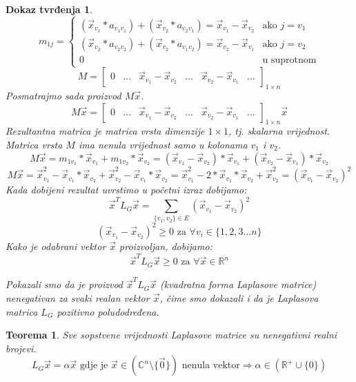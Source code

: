 \documentclass[11pt]{article}
\newtheorem{theorem}{Teorema}
\newtheorem*{custom_proof}{Dokaz tvrđenja}
\begin{document}
\begin{custom_proof}
	\[
	 m_{1j} =
	 \begin{cases}
	 (\vec{x}_{v_1} * a_{v_1 v_1}) + (\vec{x}_{v_2} * a_{v_2 v_1}) = \vec{x}_{v_1} - \vec{x}_{v_2}   & \text{ako } j = v_1 \\ 
	 (\vec{x}_{v_2} * a_{v_2 v_2}) + (\vec{x}_{v_2} * a_{v_1 v_2}) = \vec{x}_{v_2} - \vec{x}_{v_1}  & \text{ako } j = v_2  \\ 
	 0  & \text{u suprotnom}
	 \end{cases}
	\]
	\[
	M = 
	\begin{bmatrix} 
	0 & \dots &  \vec{x}_{v_1} - \vec{x}_{v_2} & \dots &  \vec{x}_{v_2} - \vec{x}_{v_1} & \dots
	\end{bmatrix}
	_{1 \times n}
	\]
	Posmatrajmo sada proizvod $M \vec{x}$.
	\[
	  M \vec{x} =\begin{bmatrix} 
	0 & \dots &  \vec{x}_{v_1} - \vec{x}_{v_2} & \dots &  \vec{x}_{v_2} - \vec{x}_{v_1} & \dots
	\end{bmatrix}
	_{1 \times n} \vec{x}  
	\]
	Rezultantna matrica je matrica vrsta dimenzije $1 \times 1$, tj. skalarna vrijednost. Matrica vrsta $M$ ima nenula vrijednost samo u kolonama $v_1$ i $v_2$.
	\[
	M \vec{x} = m_{1 v_1} * \vec{x}_{v_1} + m_{1 v_2} * \vec{x}_{v_2} =  (\vec{x}_{v_1} - \vec{x}_{v_2}) * \vec{x}_{v_1} + (\vec{x}_{v_2} - \vec{x}_{v_1}) * \vec{x}_{v_2} 
	\] 
	\[
	M \vec{x} =  \vec{x}_{v_1}^2 - \vec{x}_{v_1} * \vec{x}_{v_2} + \vec{x}_{v_2}^2 - \vec{x}_{v_1} * \vec{x}_{v_2} = \vec{x}_{v_1}^2 - 2 *\vec{x}_{v_1} * \vec{x}_{v_2} + \vec{x}_{v_2}^2 = (\vec{x}_{v_1} - \vec{x}_{v_2})^2   
	\] 
	Kada dobijeni rezultat uvrstimo u početni izraz dobijamo:
	\[
	  \vec{x}^TL_G\vec{x} = \sum_{\{v_1,v_2\} \in E} (\vec{x}_{v_1} - \vec{x}_{v_2})^2
	\]
	\[
	  (\vec{x}_{v_1} - \vec{x}_{v_2})^2 \geq 0 \text{ za } \forall v_i \in \{1,2,3 \dots n\} 
	\]
	Kako je odabrani vektor $\vec{x}$ proizvoljan, dobijamo:
	\[
	  \vec{x}^TL_G\vec{x} \geq 0 \text{ za } \forall \vec{x} \in \mathbb{R}^n
	\]

	Pokazali smo da je proizvod $\vec{x}^TL_G\vec{x}$ (kvadratna forma Laplasove matrice) nenegativan za svaki realan vektor $\vec{x}$, čime smo dokazali i da je Laplasova matrica $L_G$ pozitivno poludodređena.
	\end{custom_proof}
	
	\begin{theorem} Sve sopstvene vrijednosti Laplasove matrice su nenegativni realni brojevi.
	\[
	 L_G\vec{x} = \alpha \vec{x} \text{ gdje je } \vec{x} \in ( \mathbb{C}^n \setminus \{\vec{0}\}) \text{ nenula vektor} \Rightarrow \alpha \in (\mathbb{R}^+ \cup \{0\})
	\]
	\end{theorem}
	
\end{document}
